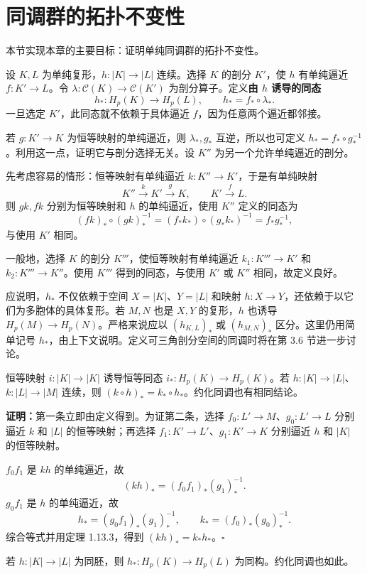 \section{同调群的拓扑不变性}
本节实现本章的主要目标：证明单纯同调群的拓扑不变性。

设 $K,L$ 为单纯复形，$h:|K|\to|L|$ 连续。选择 $K$ 的剖分 $K'$，使 $h$ 有单纯逼近 $f:K'\to L$。令 $\lambda:\mathcal C(K)\to\mathcal C(K')$ 为剖分算子。定义\textbf{由 $h$ 诱导的同态}
\[
h_*:H_p(K)\to H_p(L),\qquad h_*=f_*\circ\lambda_*.
\]
一旦选定 $K'$，此同态就不依赖于具体逼近 $f$，因为任意两个逼近都邻接。

若 $g:K'\to K$ 为恒等映射的单纯逼近，则 $\lambda_*,g_*$ 互逆，所以也可定义 $h_*=f_*\circ g_*^{-1}$。利用这一点，证明它与剖分选择无关。设 $K''$ 为另一个允许单纯逼近的剖分。

先考虑容易的情形：恒等映射有单纯逼近 $k:K''\to K'$，于是有单纯映射
\[
K''\xrightarrow{k}K'\xrightarrow{g}K,\qquad K'\xrightarrow{f}L.
\]
则 $gk,fk$ 分别为恒等映射和 $h$ 的单纯逼近，使用 $K''$ 定义的同态为
\[
(fk)_*\circ(gk)_*^{-1}=(f_*k_*)\circ(g_*k_*)^{-1}=f_*g_*^{-1},
\]
与使用 $K'$ 相同。

一般地，选择 $K$ 的剖分 $K'''$，使恒等映射有单纯逼近 $k_1:K'''\to K'$ 和 $k_2:K'''\to K''$。使用 $K'''$ 得到的同态，与使用 $K'$ 或 $K''$ 相同，故定义良好。

应说明，$h_*$ 不仅依赖于空间 $X=|K|$、$Y=|L|$ 和映射 $h:X\to Y$，还依赖于以它们为多胞体的具体复形。若 $M,N$ 也是 $X,Y$ 的复形，$h$ 也诱导 $H_p(M)\to H_p(N)$。严格来说应以 $(h_{K,L})_*$ 或 $(h_{M,N})_*$ 区分。这里仍用简单记号 $h_*$，由上下文说明。定义可三角剖分空间的同调时将在第 3.6 节进一步讨论。

恒等映射 $i:|K|\to|K|$ 诱导恒等同态 $i_*:H_p(K)\to H_p(K)$。若 $h:|K|\to|L|$、$k:|L|\to|M|$ 连续，则 $(k\circ h)_*=k_*\circ h_*$。约化同调也有相同结论。

\noindent\textbf{证明：}第一条立即由定义得到。为证第二条，选择 $f_0:L'\to M$、$g_0:L'\to L$ 分别逼近 $k$ 和 $|L|$ 的恒等映射；再选择 $f_1:K'\to L'$、$g_1:K'\to K$ 分别逼近 $h$ 和 $|K|$ 的恒等映射。

$f_0f_1$ 是 $kh$ 的单纯逼近，故
\[
(kh)_*=(f_0f_1)_*(g_1)_*^{-1}.
\]
$g_0f_1$ 是 $h$ 的单纯逼近，故
\[
h_*=(g_0f_1)_*(g_1)_*^{-1},\qquad k_*=(f_0)_*(g_0)_*^{-1}.
\]
综合等式并用定理 1.13.3，得到 $(kh)_*=k_*h_*$。\hfill$\square$

若 $h:|K|\to|L|$ 为同胚，则 $h_*:H_p(K)\to H_p(L)$ 为同构。约化同调也如此。

